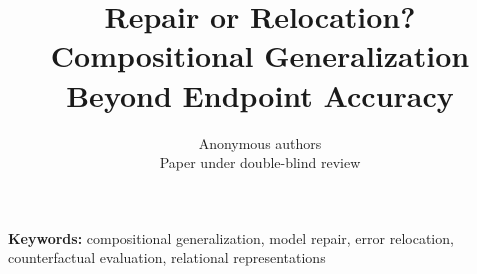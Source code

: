 \documentclass{article}
\title{Repair or Relocation? Compositional Generalization Beyond Endpoint Accuracy}
\author{Anonymous authors\\Paper under double-blind review}
\begin{document}
\maketitle
\begin{abstract}

\end{abstract}
\noindent\textbf{Keywords:} compositional generalization, model repair, error relocation, counterfactual evaluation, relational representations

\label{lastmainpage}
\clearpage



\end{document}
